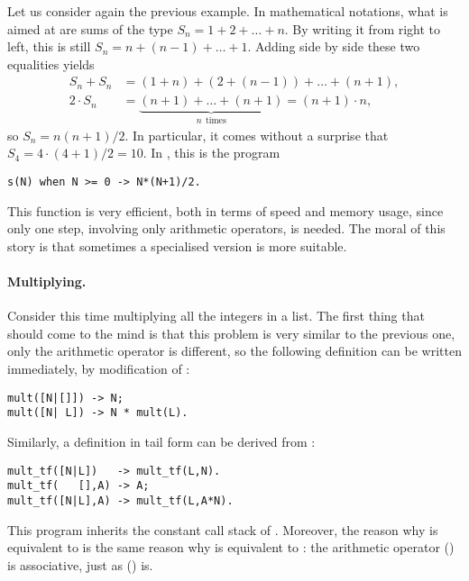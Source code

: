 Let us consider again the previous example. In mathematical notations,
what is aimed at are sums of the type \(S_n = 1 + 2 + \dots + n\). By
writing it from right to left, this is still \(S_n = n + (n-1) + \dots
+ 1\). Adding side by side these two equalities yields
\begin{align*}
S_n + S_n   &= (1 + n) + (2 + (n-1)) + \dots + (n + 1),\\ 
2 \cdot S_n &= \underbrace{(n+1) + \ldots + (n+1)}_{n \,\; \text{times}}
           = (n + 1) \cdot n,
\end{align*}
so \(S_n = n(n+1)/2\). In particular, it comes without a surprise that
\(S_4 = 4 \cdot (4+1)/2=10\). In \Erlang, this is the program
\begin{verbatim}
s(N) when N >= 0 -> N*(N+1)/2.
\end{verbatim}
This function is very efficient, both in terms of speed and memory
usage, since only one step, involving only arithmetic operators, is
needed. The moral of this story is that sometimes a specialised
version is more suitable.

\medskip

\paragraph{Multiplying.}

Consider this time multiplying all the integers in a list. The first
thing that should come to the mind is that this problem is very
similar to the previous one, only the arithmetic operator is
different, so the following definition can be written immediately, by
modification of :
\begin{verbatim}
mult([N|[]]) -> N;
mult([N| L]) -> N * mult(L).
\end{verbatim}
Similarly, a definition in tail form can be derived from
:\label{code:mult_tf}
\begin{verbatim}
mult_tf([N|L])   -> mult_tf(L,N).
mult_tf(   [],A) -> A;
mult_tf([N|L],A) -> mult_tf(L,A*N).
\end{verbatim}
This program inherits the constant call stack of .
Moreover, the reason why  is equivalent to
 is the same reason why  is
equivalent to : the arithmetic operator (\erlcode{*})
is associative, just as (\erlcode{+}) is.

